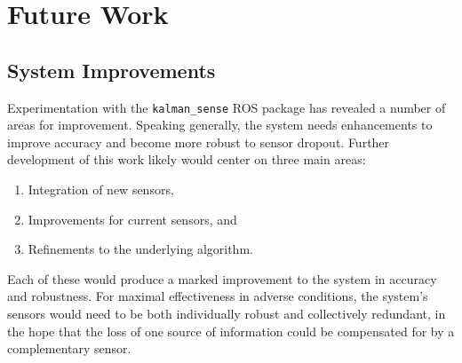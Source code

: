 \chapter{Future Work}

\section{System Improvements}

Experimentation with the \texttt{kalman\_sense} ROS package has revealed a number of areas for improvement. Speaking generally, the system needs enhancements to improve accuracy and become more robust to sensor dropout. Further development of this work likely would center on three main areas:
\begin{enumerate}
    \item Integration of new sensors,
    \item Improvements for current sensors, and
    \item Refinements to the underlying algorithm.
\end{enumerate}
Each of these would produce a marked improvement to the system in accuracy and robustness. For maximal effectiveness in adverse conditions, the system's sensors would need to be both individually robust and collectively redundant, in the hope that the loss of one source of information could be compensated for by a complementary sensor.

